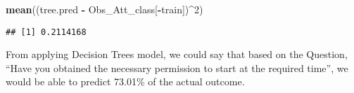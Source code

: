\documentclass[]{article}
\newenvironment{Shaded}{\begin{snugshade}}{\end{snugshade}}
\newcommand{\KeywordTok}[1]{\textcolor[rgb]{0.13,0.29,0.53}{\textbf{#1}}}
\newcommand{\DecValTok}[1]{\textcolor[rgb]{0.00,0.00,0.81}{#1}}
\newcommand{\StringTok}[1]{\textcolor[rgb]{0.31,0.60,0.02}{#1}}
\newcommand{\OperatorTok}[1]{\textcolor[rgb]{0.81,0.36,0.00}{\textbf{#1}}}
\newcommand{\NormalTok}[1]{#1}
\begin{document}
\begin{Shaded}
\begin{Highlighting}[]
\KeywordTok{mean}\NormalTok{((tree.pred }\OperatorTok{-}\StringTok{ }\NormalTok{Obs_Att_class[}\OperatorTok{-}\NormalTok{train])}\OperatorTok{^}\DecValTok{2}\NormalTok{)}
\end{Highlighting}
\end{Shaded}

\begin{verbatim}
## [1] 0.2114168
\end{verbatim}

From applying Decision Trees model, we could say that based on the
Question, ``Have you obtained the necessary permission to start at the
required time'', we would be able to predict 73.01\% of the actual
outcome.
\end{document}
